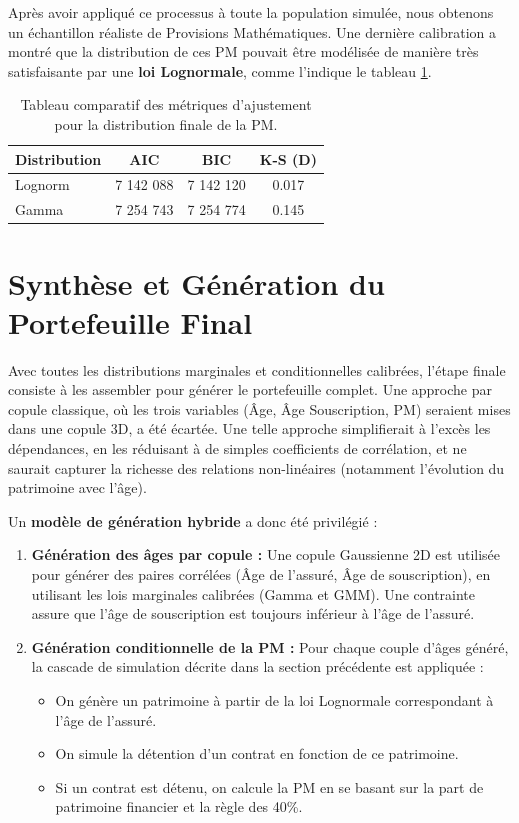 Après avoir appliqué ce processus à toute la population simulée, nous obtenons un échantillon réaliste de Provisions Mathématiques. Une dernière calibration a montré que la distribution de ces PM pouvait être modélisée de manière très satisfaisante par une \textbf{loi Lognormale}, comme l'indique le tableau \ref{tab:stats_pm}.

\begin{table}[H]
\centering
\begin{tabular}{@{}lccc@{}}
\toprule
\textbf{Distribution} & \textbf{AIC} & \textbf{BIC} & \textbf{K-S (D)} \\
\midrule
Lognorm & 7 142 088 & 7 142 120 & 0.017 \\
Gamma & 7 254 743 & 7 254 774 & 0.145 \\
\bottomrule
\end{tabular}
\caption{Tableau comparatif des métriques d'ajustement pour la distribution finale de la PM.}
\label{tab:stats_pm}
\end{table}


\section{Synthèse et Génération du Portefeuille Final}

Avec toutes les distributions marginales et conditionnelles calibrées, l'étape finale consiste à les assembler pour générer le portefeuille complet. Une approche par copule classique, où les trois variables (Âge, Âge Souscription, PM) seraient mises dans une copule 3D, a été écartée. Une telle approche simplifierait à l'excès les dépendances, en les réduisant à de simples coefficients de corrélation, et ne saurait capturer la richesse des relations non-linéaires (notamment l'évolution du patrimoine avec l'âge).

Un \textbf{modèle de génération hybride} a donc été privilégié :

\begin{enumerate}
    \item \textbf{Génération des âges par copule :} Une copule Gaussienne 2D est utilisée pour générer des paires corrélées (Âge de l'assuré, Âge de souscription), en utilisant les lois marginales calibrées (Gamma et GMM). Une contrainte assure que l'âge de souscription est toujours inférieur à l'âge de l'assuré.
    
    \item \textbf{Génération conditionnelle de la PM :} Pour chaque couple d'âges généré, la cascade de simulation décrite dans la section précédente est appliquée :
    \begin{itemize}
        \item On génère un patrimoine à partir de la loi Lognormale correspondant à l'âge de l'assuré.
        \item On simule la détention d'un contrat en fonction de ce patrimoine.
        \item Si un contrat est détenu, on calcule la PM en se basant sur la part de patrimoine financier et la règle des 40\%.
    \end{itemize}
\end{enumerate}

